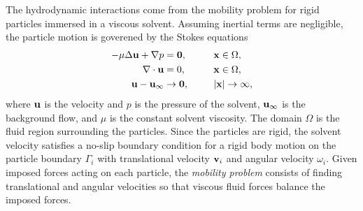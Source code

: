 The hydrodynamic interactions come from the mobility problem for rigid
particles immersed in a viscous solvent. Assuming inertial terms are
negligible, the particle motion is goverened by the Stokes equations
\begin{alignat}{3}
\label{eq:stokes1}
  -\mu \Delta \mathbf{u} + \nabla p &= \mathbf{0}, 
    && \mathbf{x} \in \Omega, \\
\label{eq:stokes2}
  \nabla\cdot \mathbf{u} &= 0, \qquad && \mathbf{x} \in \Omega, \\
\label{eq:stokes3}
  \mathbf{u} - \mathbf{u}_\infty &\to \mathbf{0}, && |\mathbf{x}| \to \infty,
\end{alignat}
%
where $\mathbf{u}$ is the velocity and $p$ is the pressure of the solvent,
$\mathbf{u}_\infty$ is the background flow, and $\mu$ is the constant
solvent viscosity. The domain
$\Omega$ is the fluid region surrounding the particles.
Since the particles are rigid, the solvent velocity 
satisfies a no-slip boundary condition for a rigid body motion 
on the particle boundary $\Gamma_i$
with translational velocity $\mathbf{v}_i$ and
angular velocity $\omega_i$.
Given imposed forces acting on each particle,
the \emph{mobility problem} consists of finding
translational and angular velocities so that 
viscous fluid forces balance the imposed forces.

